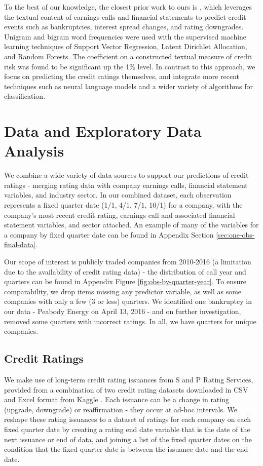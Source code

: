 \documentclass{article}[11pt]
\begin{document}
    To the best of our knowledge, the closest prior work to ours is \cite{donovan_measuring_2021}, which leverages the textual content of earnings calls and financial statements to predict credit events such as bankruptcies, interest spread changes, and rating downgrades. Unigram and bigram word frequencies were used with the supervised machine learning techniques of Support Vector Regression, Latent Dirichlet Allocation, and Random Forests. The coefficient on a constructed textual measure of credit risk was found to be significant up the 1\% level. In contrast to this approach, we focus on predicting the credit ratings themselves, and integrate more recent techniques such as neural language models and a wider variety of algorithms for classification.

    \section*{Data and Exploratory Data Analysis}

    We combine a wide variety of data sources to support our predictions of credit ratings - merging rating data with company earnings calls, financial statement variables, and industry sector. In our combined dataset, each observation represents a fixed quarter date (1/1, 4/1, 7/1, 10/1) for a company, with the company's most recent credit rating, earnings call and associated financial statement variables, and sector attached. An example of many of the variables for a company by fixed quarter date can be found in Appendix Section \ref{sec:one-obs-final-data}.

    Our scope of interest is publicly traded companies from 2010-2016 (a limitation due to the availability of credit rating data) - the distribution of call year and quarters can be found in Appendix Figure \ref{fig:obs-by-quarter-year}. To ensure comparability, we drop items missing any predictor variable, as well as some companies with only a few (3 or less) quarters. We identified one bankruptcy in our data - Peabody Energy on April 13, 2016 - and on further investigation, removed some quarters with incorrect ratings. In all, we have \numQuarters \space quarters for \numCompanies \space unique companies.

    \subsection*{Credit Ratings}

    We make use of long-term credit rating issuances from S and P Rating Services, provided from a combination of two credit rating datasets downloaded in CSV and Excel format from Kaggle \citep{gewerc_corporate_2020,makwana_corporate_2022}. Each issuance can be a change in rating (upgrade, downgrade) or reaffirmation - they occur at ad-hoc intervals. We reshape these rating issuances to a dataset of ratings for each company on each fixed quarter date by creating a rating end date variable that is the date of the next issuance or end of data, and joining a list of the fixed quarter dates on the condition that the fixed quarter date is between the issuance date and the end date.
\end{document}

